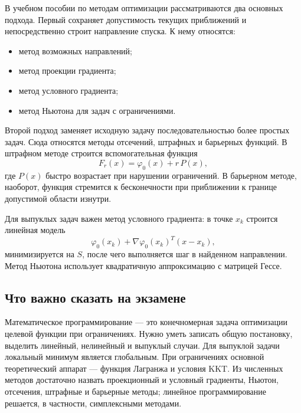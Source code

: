 В учебном пособии по методам оптимизации рассматриваются два основных подхода.
Первый сохраняет допустимость текущих приближений и непосредственно строит
направление спуска. К нему относятся:
\begin{itemize}
    \item метод возможных направлений;
    \item метод проекции градиента;
    \item метод условного градиента;
    \item метод Ньютона для задач с ограничениями.
\end{itemize}

Второй подход заменяет исходную задачу последовательностью более простых задач.
Сюда относятся методы отсечений, штрафных и барьерных функций. В штрафном методе
строится вспомогательная функция
\[
    F_r(x)=\varphi_0(x)+r\,P(x),
\]
где $P(x)$ быстро возрастает при нарушении ограничений. В барьерном методе,
наоборот, функция стремится к бесконечности при приближении к границе допустимой
области изнутри.

Для выпуклых задач важен метод условного градиента: в точке $x_k$ строится
линейная модель
\[
    \varphi_0(x_k)+\nabla\varphi_0(x_k)^T(x-x_k),
\]
минимизируется на $S$, после чего выполняется шаг в найденном направлении. Метод
Ньютона использует квадратичную аппроксимацию с матрицей Гессе.

\subsection{Что важно сказать на экзамене}

Математическое программирование --- это конечномерная задача оптимизации
целевой функции при ограничениях. Нужно уметь записать общую постановку,
выделить линейный, нелинейный и выпуклый случаи. Для выпуклой задачи локальный
минимум является глобальным. При ограничениях основной теоретический аппарат ---
функция Лагранжа и условия KKT. Из численных методов достаточно назвать
проекционный и условный градиенты, Ньютон, отсечения, штрафные и барьерные
методы; линейное программирование решается, в частности, симплексными методами.

\newpage
